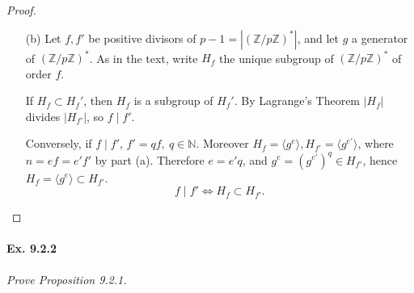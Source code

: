\documentclass[11pt,a4paper]{article}
\newcommand{\Z}{\mathbb{Z}}
\newcommand{\N}{\mathbb{N}}
\begin{document}
\begin{proof}
\begin{enumerate}
We show first that $k \mid n$. Write $d = k\wedge n$. There exist integers $u,v$ such that $d = uk+vn$, therefore $g^d =(g^k)^u (g^n)^v= (g^k)^u \in K$, so $d \in E$, and $1 \leq d \leq k$, therefore $d = k$ by definition of $k = \min(E)$. So $k = k \wedge n$, hence $k \mid n$.

$K = \langle g^k \rangle$ is cyclic, and its cardinality is the order of $g^k,\  k\mid n$,  so
$$  |K| = \langle g^k \rangle = o(g^k)= \frac{n}{k},$$
by the first part of the proof.

By hypothesis the order of $K$ is $f$, so $f = \vert K \vert =n/k$, and $k= n/f= e$.$$K = \langle g^e \rangle = H.$$

Conclusion: 

A cyclic group with generator $g$, of order $n=ef$, contains a unique subgroup of order $f$, written $H_f$, which is cyclic, generated by $g^e$.


\item[(b)]
Let $f,f'$ be positive divisors of $p-1 = |(\Z/p\Z)^*|$, and let $g$ a generator of $(\Z/p\Z)^*$. As in the text, write $H_f$ the unique subgroup of $(\Z/p\Z)^*$ of order $f$.

If $H_f \subset H_f'$, then $H_f$ is a subgroup of $H_f'$. By Lagrange's Theorem  $\vert H_f \vert$ divides $\vert H_{f'} \vert$, so $f \mid f'$.

Conversely, if $f \mid f'$, $f' = q f, \ q \in \N$. Moreover $H_f = \langle g^e \rangle, H_{f'}= \langle g^{e'} \rangle$, where $n = ef =e'f'$ by part (a). Therefore $e = e'q$, and $g^e = (g^{e'})^q \in H_{f'}$, hence $H_f = \langle g^e \rangle \subset H_{f'}$.
$$f \mid f' \iff H_f \subset H_{f'}.$$
\end{enumerate}
\end{proof}

\paragraph{Ex. 9.2.2}

{\it Prove Proposition 9.2.1.
}
\end{document}
